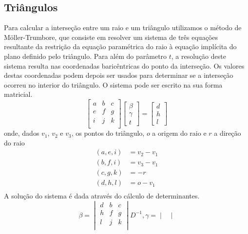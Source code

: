 \documentclass{article}
\begin{document}
\begin{multicols}{2}
    
    \subsection{Triângulos}

    Para calcular a interseção entre um raio e um triângulo utilizamos o método de Möller-Trumbore,
    que consiste em resolver um sistema de três equações resultante da restrição da equação paramétrica do raio à equação implícita do plano definido pelo triângulo. Para além do parâmetro
    $t$, a resolução deste sistema resulta nas coordenadas baricêntricas do ponto da interseção. Os
    valores destas coordenadas podem depois ser usados para determinar se a interseção ocorreu no
    interior do triângulo. O sistema pode ser escrito na sua forma matricial.
    $$
        \begin{bmatrix}
            a & b & c \\
            e & f & g \\
            i & j & k \\
        \end{bmatrix}
        \begin{bmatrix}
            \beta \\ \gamma \\ t
        \end{bmatrix}
        =
        \begin{bmatrix}
            d \\ h \\ l
        \end{bmatrix}
    $$
    onde, dados $v_1$, $v_2$ e $v_3$, os pontos do triângulo, $o$ a origem do raio e $r$ a
    direção do raio
    \begin{align*}
        (a, e, i) &= v_2 - v_1 \\
        (b, f, i) &= v_3 - v_1 \\
        (c, g, k) &= -r \\
        (d, h, l) &= o - v_1 \\
    \end{align*}
    A solução do sistema é dada através do cálculo de determinantes.
    $$
        \beta =
        \begin{vmatrix}
            d & b & c \\
            h & f & g \\
            l & j & k \\
        \end{vmatrix}
        D^{-1},
        \gamma =
        \begin{vmatrix}

\end{vmatrix}$$
\end{multicols}
\end{document}
